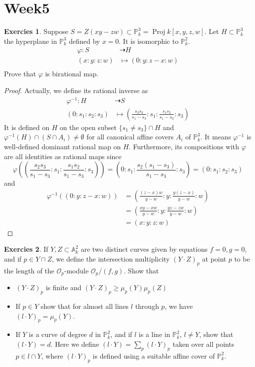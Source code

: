 \documentclass[12pt,a4paper]{article}
\theoremstyle{definition}
\newtheorem{exer}{Exercies}[section]
\DeclareMathOperator{\proj}{Proj}
\begin{document}
\section{Week5}
\begin{exer}
	Suppose $S = Z(xy-zw) \subset \mathbb{P}^3_k = \proj k[x,y,z,w]$. Let $H \subset \mathbb{P}_k^3$ the hyperplane in $\mathbb{P}_k^3$ defined by $x=0$. It is isomorphic to $\mathbb{P}_k^2$.
	\[\begin{aligned}
		\varphi \colon S &\dashrightarrow H \\
		(x: y: z: w) &\mapsto (0: y: z-x: w)\\
	\end{aligned}\]
	Prove that $\varphi$ is birational map.
\end{exer}
\begin{proof}
	Actually, we define its rational inverse as 
\[
\begin{aligned}
\varphi^{-1} \colon H &\dashrightarrow S\\
(0: s_1: s_2: s_3) & \mapsto (\frac{s_2 s_3}{s_1 -s_3}: s_1 : \frac{s_1 s_2}{s_1 - s_3}: s_3)
\end{aligned}
\]
It is defined on $H$ on the open subset $\{s_1 \neq s_3\} \cap H$ and $\varphi^{-1}(H) \cap (S \cap A_i) \neq \emptyset$ for all canonical affine covers $A_i$ of $\mathbb{P}_k^3$. It means $\varphi^{-1}$ is well-defined dominant rational map on $H$. Furthermore, its compositions with $\varphi$ are all identities as rational maps since
\[
 \varphi((\frac{s_2 s_3}{s_1 - s_3}: s_1 : \frac{s_1 s_2}{s_1 -s_3}:s_3)) = (0: s_1: \frac{s_2(s_1-s_3)}{s_1 - s_3}: s_3) = (0: s_1: s_2 : s_3)
\]
and
\[
\begin{aligned}
\varphi^{-1}((0:y:z-x:w)) &= (\frac{(z-x)w}{y-w}: y: \frac{y(z-x)}{y-w}: w)\\
 &= (\frac{xy-xw}{y-w}: y: \frac{yz- zw}{y-w}: w)\\
 & =(x:y:z:w)
\end{aligned}
\]
\end{proof}
\begin{exer}
	If $Y, Z \subset \mathbb{A}^2_k$ are two distinct curves given by equations $f=0,  g=0$, and if $p \in Y\cap Z$, we define the intersection multiplicity $(Y\cdot Z)_p$ at point $p$ to be the length of the $\mathcal{O}_p$-module $\mathcal{O}_p/(f,g)$. Show that 
	\begin{itemize}
		\item $(Y\cdot Z)_p$ is finite and $(Y\cdot Z)_p \geq \mu_p(Y) \mu_p(Z)$
		\item  If $p \in Y$ show that for almost all lines $l$ through $p$, we have $(l \cdot Y)_p = \mu_p(Y)$.
		\item If $Y$ is a curve of degree $d$ in $ \mathbb{P}_k^2$, and if $l$ is a line in $\mathbb{P}_k^2$, $l \neq Y$, show that $(l \cdot Y) =d $. Here we define $(l \cdot Y) = \sum_p (l \cdot Y)_p$ taken over all points $p \in l \cap Y$, where  $(l\cdot Y)_p$ is defined using a suitable affine cover of $\mathbb{P}_k^2$.
	\end{itemize}
\end{exer}
\end{document}
